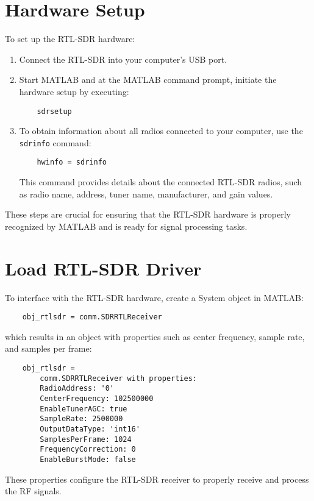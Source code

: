 \section*{Hardware Setup}

To set up the RTL-SDR hardware:

\begin{enumerate}
    \item Connect the RTL-SDR into your computer's USB port.
    
    \item Start MATLAB and at the MATLAB command prompt, initiate the hardware setup by executing:
    \begin{verbatim}
    sdrsetup
    \end{verbatim}
    
    \item To obtain information about all radios connected to your computer, use the \texttt{sdrinfo} command:
    \begin{verbatim}
    hwinfo = sdrinfo
    \end{verbatim}
    This command provides details about the connected RTL-SDR radios, such as radio name, address, tuner name, manufacturer, and gain values.
\end{enumerate}

These steps are crucial for ensuring that the RTL-SDR hardware is properly recognized by MATLAB and is ready for signal processing tasks.

\section*{Load RTL-SDR Driver}

To interface with the RTL-SDR hardware, create a System object in MATLAB:
\begin{verbatim}
    obj_rtlsdr = comm.SDRRTLReceiver
\end{verbatim}
which results in an object with properties such as center frequency, sample rate, and samples per frame:
\begin{verbatim}
    obj_rtlsdr = 
        comm.SDRRTLReceiver with properties:
        RadioAddress: '0'
        CenterFrequency: 102500000
        EnableTunerAGC: true
        SampleRate: 2500000
        OutputDataType: 'int16'
        SamplesPerFrame: 1024
        FrequencyCorrection: 0
        EnableBurstMode: false
\end{verbatim}
These properties configure the RTL-SDR receiver to properly receive and process the RF signals.

